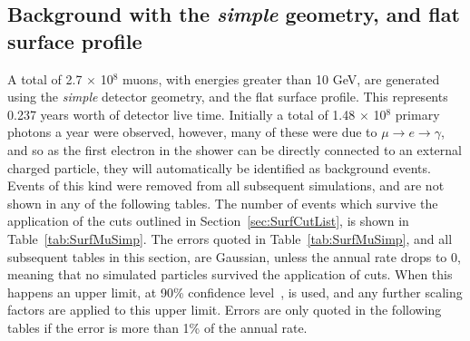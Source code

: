 \subsection{Background with the \emph{simple} geometry, and flat surface profile}
A total of 2.7 $\times$ 10$^8$ muons, with energies greater than 10 GeV, are generated using the \emph{simple} detector geometry, and the flat surface profile. This represents 0.237 years worth of detector live time. Initially a total of 1.48 $\times$ 10$^8$ primary photons a year were observed, however, many of these were due to $\mu \rightarrow e \rightarrow \gamma$, and so as the first electron in the shower can be directly connected to an external charged particle, they will automatically be identified as background events. Events of this kind were removed from all subsequent simulations, and are not shown in any of the following tables. The number of events which survive the application of the cuts outlined in Section~\ref{sec:SurfCutList}, is shown in Table~\ref{tab:SurfMuSimp}. The errors quoted in Table~\ref{tab:SurfMuSimp}, and all subsequent tables in this section, are Gaussian, unless the annual rate drops to 0, meaning that no simulated particles survived the application of cuts. When this happens an upper limit, at 90\% confidence level~\citep{PhysRevD.57.3873}, is used, and any further scaling factors are applied to this upper limit. Errors are only quoted in the following tables if the error is more than 1\% of the annual rate. \\

